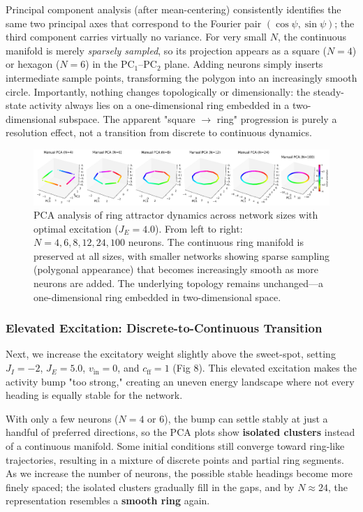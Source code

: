 \documentclass[11pt,a4paper]{article}
\begin{document}
Principal component analysis (after mean-centering) consistently identifies the same two principal axes that correspond to the Fourier pair $(\cos\psi, \sin\psi)$; the third component carries virtually no variance. For very small $N$, the continuous manifold is merely \emph{sparsely sampled}, so its projection appears as a square ($N=4$) or hexagon ($N=6$) in the $\text{PC}_1$–$\text{PC}_2$ plane. Adding neurons simply inserts intermediate sample points, transforming the polygon into an increasingly smooth circle. Importantly, nothing changes topologically or dimensionally: the steady-state activity always lies on a one-dimensional ring embedded in a two-dimensional subspace. The apparent "square $\to$ ring" progression is purely a resolution effect, not a transition from discrete to continuous dynamics.

\begin{figure}[H]
\centering
\includegraphics[width=1.0\textwidth]{manual_pca_varying_N_ring.png}
\caption{PCA analysis of ring attractor dynamics across network sizes with optimal excitation ($J_E = 4.0$). From left to right: $N = 4, 6, 8, 12, 24, 100$ neurons. The continuous ring manifold is preserved at all sizes, with smaller networks showing sparse sampling (polygonal appearance) that becomes increasingly smooth as more neurons are added. The underlying topology remains unchanged—a one-dimensional ring embedded in two-dimensional space.}
\label{fig:network_size_optimal}
\end{figure}

\subsubsection*{Elevated Excitation: Discrete-to-Continuous Transition}

Next, we increase the excitatory weight slightly above the sweet-spot, setting $J_I = -2$, $J_E = 5.0$, $v_{\text{in}} = 0$, and $c_{\text{ff}} = 1$ (Fig 8). This elevated excitation makes the activity bump "too strong," creating an uneven energy landscape where not every heading is equally stable for the network.

With only a few neurons ($N = 4$ or $6$), the bump can settle stably at just a handful of preferred directions, so the PCA plots show \textbf{isolated clusters} instead of a continuous manifold. Some initial conditions still converge toward ring-like trajectories, resulting in a mixture of discrete points and partial ring segments. As we increase the number of neurons, the possible stable headings become more finely spaced; the isolated clusters gradually fill in the gaps, and by $N \approx 24$, the representation resembles a \textbf{smooth ring} again. 
\end{document}

